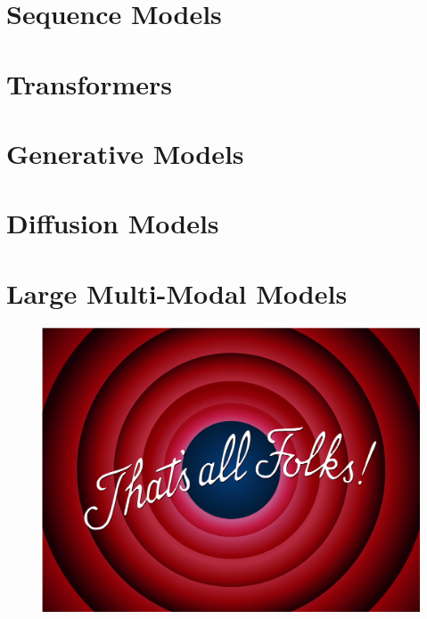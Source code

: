 \documentclass[11pt,fleqn,oneside]{book} %
\begin{document}
\newpage
\chapter{Sequence Models}


\newpage
\chapter{Transformers}


\newpage
\chapter{Generative Models}


\newpage
\chapter{Diffusion Models}


\newpage
\chapter{Large Multi-Modal Models}


\newpage
{}

\begin{figure}[!htbp]
    \centering
    \includegraphics[width=\linewidth]{tikz/chapter12 - That's all Folks.png}
    \caption{}
\end{figure}
\end{document}
